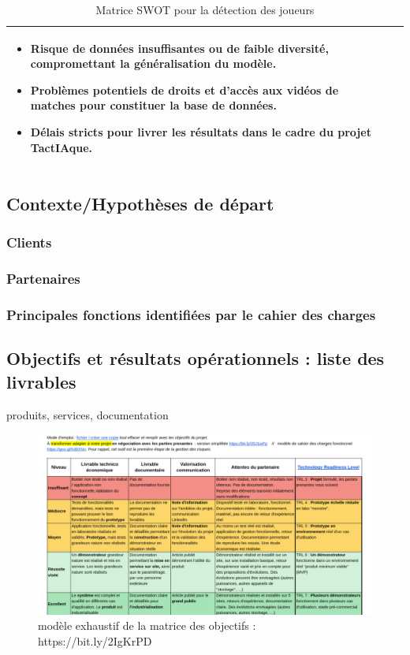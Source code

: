 \begin{table} [!h]
\begin{tabular}{|p{7cm}|p{7cm}|}
        \begin{itemize}
            \item Risque de données insuffisantes ou de faible diversité, compromettant la généralisation du modèle. 
            \item Problèmes potentiels de droits et d’accès aux vidéos de matches pour constituer la base de données. 
            \item Délais stricts pour livrer les résultats dans le cadre du projet TactIAque. 
        \end{itemize}\\
        \hline  
        \end{tabular}  
        \caption{Matrice SWOT pour la détection des joueurs}  
        \label{tab:swot}
    \end{table} 
\clearpage
\subsection{Contexte/Hypothèses de départ}
\subsubsection{Clients}
\subsubsection{Partenaires}
\subsubsection{Principales fonctions identifiées par le cahier des charges}

\clearpage
\subsection{Objectifs et résultats opérationnels : liste des livrables}
produits, services, documentation
\begin{figure}[!h]
	\begin{center} 
		\includegraphics[scale=0.4]{images/modele_plus_exhaustif_matrice_objectifs.png}
		\caption{modèle exhaustif de la matrice des objectifs : https://bit.ly/2IgKrPD}
	\end{center}
\end{figure}
